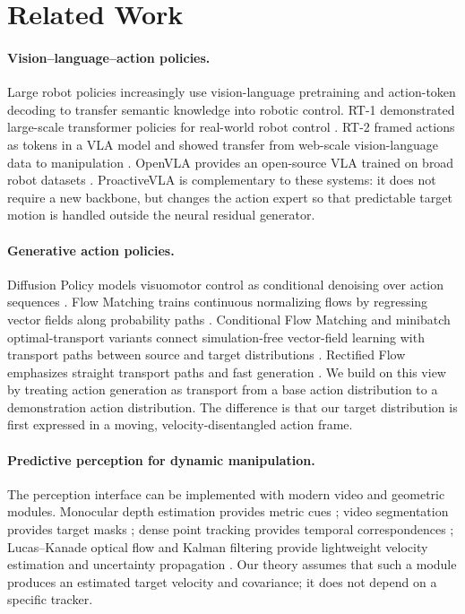 \documentclass{article} %
\begin{document}
\section{Related Work}
\label{sec:related}

\paragraph{Vision--language--action policies.}
Large robot policies increasingly use vision-language pretraining and action-token decoding to transfer semantic knowledge into robotic control. RT-1 demonstrated large-scale transformer policies for real-world robot control \citep{brohan2023rt1}. RT-2 framed actions as tokens in a VLA model and showed transfer from web-scale vision-language data to manipulation \citep{zitkovich2023rt2}. OpenVLA provides an open-source VLA trained on broad robot datasets \citep{kim2024openvla}. ProactiveVLA is complementary to these systems: it does not require a new backbone, but changes the action expert so that predictable target motion is handled outside the neural residual generator.

\paragraph{Generative action policies.}
Diffusion Policy models visuomotor control as conditional denoising over action sequences \citep{chi2023diffusionpolicy}. Flow Matching trains continuous normalizing flows by regressing vector fields along probability paths \citep{lipman2023flow}. Conditional Flow Matching and minibatch optimal-transport variants connect simulation-free vector-field learning with transport paths between source and target distributions \citep{tong2024improving}. Rectified Flow emphasizes straight transport paths and fast generation \citep{liu2023rectified}. We build on this view by treating action generation as transport from a base action distribution to a demonstration action distribution. The difference is that our target distribution is first expressed in a moving, velocity-disentangled action frame.

\paragraph{Predictive perception for dynamic manipulation.}
The perception interface can be implemented with modern video and geometric modules. Monocular depth estimation provides metric cues \citep{yang2024depthanythingv2}; video segmentation provides target masks \citep{ravi2024sam2}; dense point tracking provides temporal correspondences \citep{karaev2024cotracker}; Lucas--Kanade optical flow and Kalman filtering provide lightweight velocity estimation and uncertainty propagation \citep{lucas1981iterative,kalman1960filtering}. Our theory assumes that such a module produces an estimated target velocity and covariance; it does not depend on a specific tracker.
\end{document}

